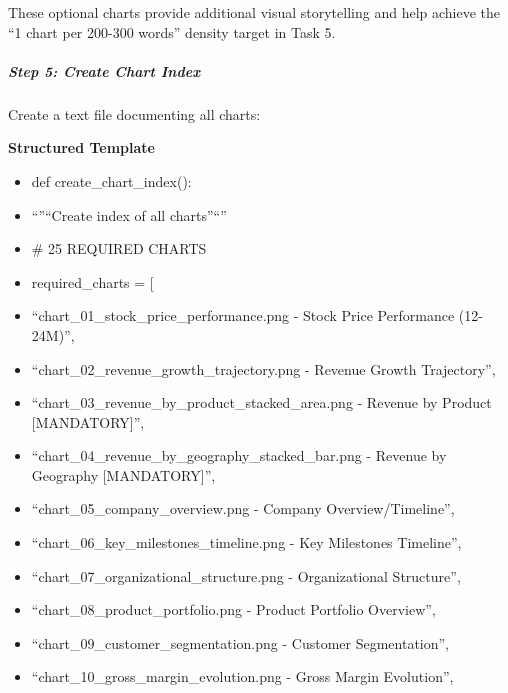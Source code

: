 \documentclass[11pt]{article}
\begin{document}
These optional charts provide additional visual storytelling and help achieve the ``1 chart per 200-300 words'' density target in Task 5.


\subparagraph{Step 5: Create Chart Index}\mbox{}\par

Create a text file documenting all charts:


\textbf{Structured Template}
\begin{itemize}[leftmargin=*,itemsep=2pt,topsep=2pt]
\item {} def create\_\allowbreak{}chart\_\allowbreak{}index():
\item {} ``''``Create index of all charts''``''
\item {} \# 25 REQUIRED CHARTS
\item {} required\_\allowbreak{}charts = [
\item {} ``chart\_\allowbreak{}01\_\allowbreak{}stock\_\allowbreak{}price\_\allowbreak{}performance.png - Stock Price Performance (12-24M)'',
\item {} ``chart\_\allowbreak{}02\_\allowbreak{}revenue\_\allowbreak{}growth\_\allowbreak{}trajectory.png - Revenue Growth Trajectory'',
\item {} ``chart\_\allowbreak{}03\_\allowbreak{}revenue\_\allowbreak{}by\_\allowbreak{}product\_\allowbreak{}stacked\_\allowbreak{}area.png - Revenue by Product [MANDATORY]'',
\item {} ``chart\_\allowbreak{}04\_\allowbreak{}revenue\_\allowbreak{}by\_\allowbreak{}geography\_\allowbreak{}stacked\_\allowbreak{}bar.png - Revenue by Geography [MANDATORY]'',
\item {} ``chart\_\allowbreak{}05\_\allowbreak{}company\_\allowbreak{}overview.png - Company Overview/Timeline'',
\item {} ``chart\_\allowbreak{}06\_\allowbreak{}key\_\allowbreak{}milestones\_\allowbreak{}timeline.png - Key Milestones Timeline'',
\item {} ``chart\_\allowbreak{}07\_\allowbreak{}organizational\_\allowbreak{}structure.png - Organizational Structure'',
\item {} ``chart\_\allowbreak{}08\_\allowbreak{}product\_\allowbreak{}portfolio.png - Product Portfolio Overview'',
\item {} ``chart\_\allowbreak{}09\_\allowbreak{}customer\_\allowbreak{}segmentation.png - Customer Segmentation'',
\item {} ``chart\_\allowbreak{}10\_\allowbreak{}gross\_\allowbreak{}margin\_\allowbreak{}evolution.png - Gross Margin Evolution'',

\end{itemize}
\end{document}
